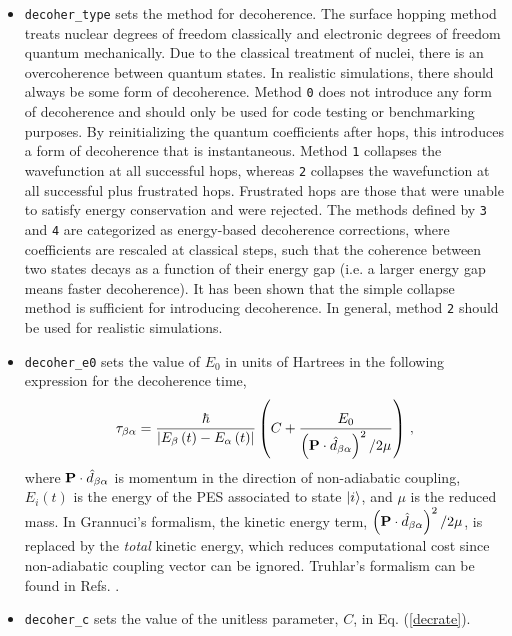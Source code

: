 \documentclass[letterpaper,12pt,titlepage]{article}
\begin{document}
\begin{itemize}
\item \verb+decoher_type+ sets the method for decoherence.  The surface hopping method treats nuclear degrees of freedom classically and electronic degrees of freedom quantum mechanically.  Due to the classical treatment of nuclei, there is an overcoherence between quantum states.  In realistic simulations, there should always be some form of decoherence.  Method \verb+0+ does not introduce any form of decoherence and should only be used for code testing or benchmarking purposes.  By reinitializing the quantum coefficients after hops, this introduces a form of decoherence that is instantaneous.  Method \verb+1+ collapses the wavefunction at all successful hops, whereas \verb+2+ collapses the wavefunction at all successful plus frustrated hops.  Frustrated hops are those that were unable to satisfy energy conservation and were rejected.  The methods defined by \verb+3+ and \verb+4+ are categorized as energy-based decoherence corrections, where coefficients are rescaled at classical steps, such that the coherence between two states decays as a function of their energy gap (i.e. a larger energy gap means faster decoherence).  It has been shown that the simple collapse method is sufficient for introducing decoherence.\cite{nelson2013nonadiabatic}   In general, method \verb+2+ should be used for realistic simulations.
\item \verb+decoher_e0+ sets the value of $E_{0}$ in units of Hartrees in the following expression for the decoherence time,
\begin{equation}
\label{decrate}
\tau_{\beta\alpha}=\frac{\hbar}{\left|E_{\beta}\left(t\right)-E_{\alpha}\left(t\right)\right|}\left(C+\frac{E_{0}}{\left({\bf{P}}\cdot\hat{d}_{\beta\alpha}\right)^{2}/2\mu}\right)\,,
\end{equation}
where ${\bf{P}}\cdot\hat{d}_{\beta\alpha}$ is momentum in the direction of non-adiabatic coupling, $E_{i}\left(t\right)$ is the energy of the PES associated to state $\ket{i}$, and $\mu$ is the reduced mass.  In Grannuci's formalism,\cite{granucci2010including,granucci2007critical} the kinetic energy term, $\left({\bf{P}}\cdot\hat{d}_{\beta\alpha}\right)^{2}/2\mu$, is replaced by the \textit{total} kinetic energy, which reduces computational cost since non-adiabatic coupling vector can be ignored.  Truhlar's formalism can be found in Refs. \cite{zhu2004coherent,hack2001natural}.
\item \verb+decoher_c+ sets the value of the unitless parameter, $C$, in Eq. (\ref{decrate}).

\end{itemize}
\end{document}
